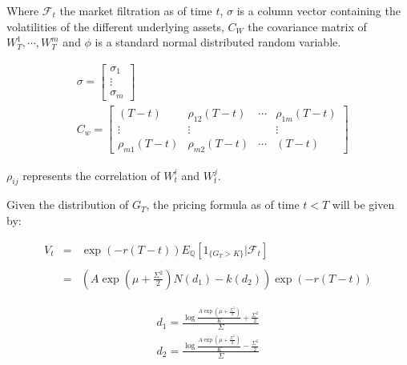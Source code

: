 Where $\mathcal{F}_t$ the market filtration as of time $t$, $\sigma$ is a column vector containing the volatilities of the different underlying assets, $C_W$ the covariance matrix of $W_T^1,\cdots,W_T^m$ and $\phi$ is a standard normal distributed random variable.

\begin{equation} \label{eq:geom_digital_distrib_params2}
\begin{aligned}
&\sigma=\left[\begin{array}{c}
\sigma_{1} \\
\vdots \\
\sigma_{m}
\end{array}\right] \\
&C_{w}=\left[\begin{array}{cccc}
\left(T-t\right) & \rho_{12} \left(T-t\right) & \cdots & \rho_{1 m} \left(T-t\right) \\
\vdots & \vdots & & \vdots \\
\rho_{m 1} \left(T-t\right) & \rho_{m 2} \left(T-t\right) & \cdots &  \left(T-t\right)
\end{array}\right]
\end{aligned}
\end{equation} 

$\rho_{ij}$ represents the correlation of $W_t^i$ and $W_t^j$.

Given the distribution of $G_T$, the pricing formula as of time $t<T$ will be given by:

$$
\begin{array}{lll}
V_{t}&=&\exp (-r(T-t)) E_{\mathbb{Q}}\left[1_{\{G_{T}>K\}} | \mathcal{F}_t\right] \\
&& \\
&=&\left(A\exp\left(\mu+\frac{\Sigma^2}{2}\right)N\left(d_1\right)-k\left(d_2\right)\right)\exp\left(-r(T-t)\right)
\end{array}
$$

$$
\begin{aligned}
d_1 = \frac{\log\frac{A\exp\left(\mu+\frac{\Sigma^2}{2}\right)}{K}+\frac{\Sigma^2}{2}}{\Sigma} \\
d_2 = \frac{\log\frac{A\exp\left(\mu+\frac{\Sigma^2}{2}\right)}{K}-\frac{\Sigma^2}{2}}{\Sigma} \\
\end{aligned}
$$



